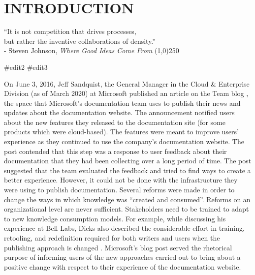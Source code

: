 \chapter{INTRODUCTION}
\label{chap-one}

\begin{flushright}

  ``It is not competition that drives processes,
  \\but rather the inventive collaborations of density.''
  \\- Steven Johnson, \textit{Where Good Ideas Come From}
  \line(1,0){250}
\end{flushright}

#edit2
#edit3

On June 3, 2016, Jeff Sandquist, the General Manager in the Cloud \& Enterprise Division (as of March 2020) at Microsoft published an article on the Team blog \cite{sandquist}, the space that Microsoft’s documentation team uses to publish their news and updates about the documentation website. The announcement notified users about the new features they released to the documentation site (for some products which were cloud-based). The features were meant to improve users' experience as they continued to use the company’s documentation website. The post contended that this step was a response to user feedback about their documentation that they had been collecting over a long period of time. The post suggested that the team evaluated the feedback and tried to find ways to create a better experience. However, it could not be done with the infrastructure they were using to publish documentation. Several reforms were made in order to change the ways in which knowledge was “created and consumed”. Reforms on an organizational level are never sufficient. Stakeholders need to be trained to adapt to new knowledge consumption models. For example, while discussing his experience at Bell Labs, Dicks also described the considerable effort in training, retooling, and redefinition required for both writers and users when the publishing approach is changed \cite{dicks1994integrating}. Microsoft’s blog post served the rhetorical purpose of informing users of the new approaches carried out to bring about a positive change with respect to their experience of the documentation website.

